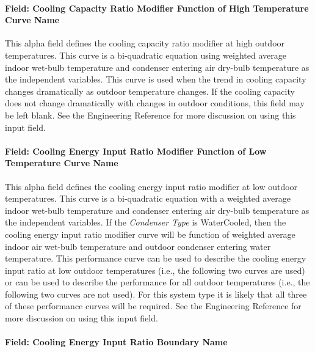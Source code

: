 \paragraph{Field: Cooling Capacity Ratio Modifier Function of High Temperature Curve Name}\label{field-cooling-capacity-ratio-modifier-function-of-high-temperature-curve-name}

This alpha field defines the cooling capacity ratio modifier at high outdoor temperatures. This curve is a bi-quadratic equation using weighted average indoor wet-bulb temperature and condenser entering air dry-bulb temperature as the independent variables. This curve is used when the trend in cooling capacity changes dramatically as outdoor temperature changes. If the cooling capacity does not change dramatically with changes in outdoor conditions, this field may be left blank. See the Engineering Reference for more discussion on using this input field.

\paragraph{Field: Cooling Energy Input Ratio Modifier Function of Low Temperature Curve Name}\label{field-cooling-energy-input-ratio-modifier-function-of-low-temperature-curve-name}

This alpha field defines the cooling energy input ratio modifier at low outdoor temperatures. This curve is a bi-quadratic equation with a weighted average indoor wet-bulb temperature and condenser entering air dry-bulb temperature as the independent variables. If the \textit{Condenser Type} is WaterCooled, then the cooling energy input ratio modifier curve will be function of weighted average indoor air wet-bulb temperature and outdoor condenser entering water temperature. This performance curve can be used to describe the cooling energy input ratio at low outdoor temperatures (i.e., the following two curves are used) or can be used to describe the performance for all outdoor temperatures (i.e., the following two curves are not used). For this system type it is likely that all three of these performance curves will be required. See the Engineering Reference for more discussion on using this input field.

\paragraph{Field: Cooling Energy Input Ratio Boundary Name}\label{field-cooling-energy-input-ratio-boundary-name}

